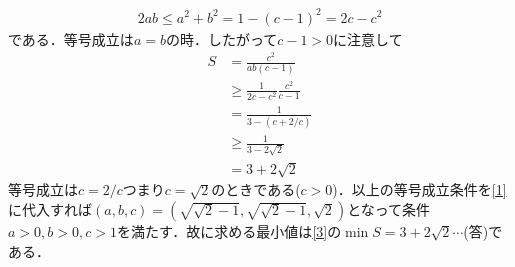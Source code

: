 \documentclass[a4j]{jarticle}
\begin{document}
\begin{multicols}{2}
     \begin{align*}
     2ab\le a^2+b^2=1-(c-1)^2=2c-c^2
     \end{align*}
である．等号成立は$a=b$の時．したがって$c-1>0$に注意して
     \begin{align}
     S&=\frac{c^2}{ab(c-1)} \nonumber\\
     &\ge \frac{1}{2c-c^2}\frac{c^2}{c-1} \nonumber\\
     &=\frac{1}{3-(c+2/c)} \nonumber\\
     &\ge \frac{1}{3-2\sqrt{2}}\tag{$\because$AM-GM} \\
     &=3+2\sqrt{2} \label{3}
     \end{align}
等号成立は$c=2/c$つまり$c=\sqrt{2}$のときである($c>0$)．以上の等号成立条件を\eqref{1}
に代入すれば$(a,b,c)=(\sqrt{\sqrt{2}-1},\sqrt{\sqrt{2}-1},\sqrt{2})$となって条件$a>0,b>0,c>1$を満たす．故に求める最小値は\eqref{3}の$\min S=3+2\sqrt{2}\cdots$(答)である．
\newpage
\end{multicols}
\end{document}
